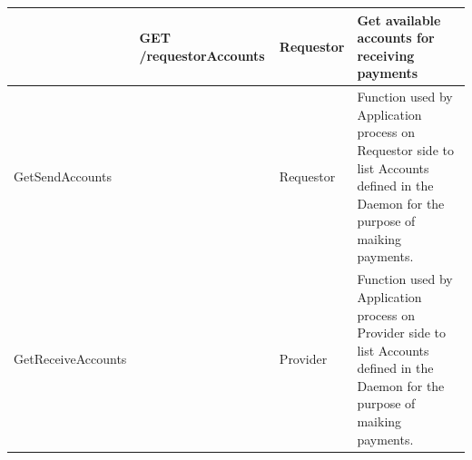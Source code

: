 \begin{enumerate}
\begin{enumerate}
\begin{table}[H]
\begin{center}
\begin{tabular}{|p{3cm}|p{7cm}|p{1.5cm}|p{4cm}|}
						&	GET /requestorAccounts						&	Requestor 	&	Get available accounts for receiving payments \\
\hline

GetSendAccounts			&												&	Requestor 	&	Function used by Application process on Requestor side to
																							list Accounts defined in the Daemon for the purpose of maiking payments. \\
\hline

GetReceiveAccounts		&												&	Provider 	&	Function used by Application process on Provider side to
																							list Accounts defined in the Daemon for the purpose of maiking payments. \\
\hline


\end{tabular}
\end{center}
\end{table}

\end{enumerate}

\end{enumerate}










